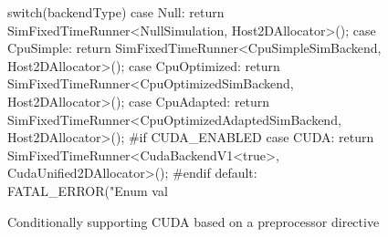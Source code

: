 \begin{figure}[ht]
    \centering
\begin{cppcode}
switch(backendType) {
    case Null:
        return SimFixedTimeRunner<NullSimulation, Host2DAllocator>();
    case CpuSimple:
        return SimFixedTimeRunner<CpuSimpleSimBackend, Host2DAllocator>();
    case CpuOptimized:
        return SimFixedTimeRunner<CpuOptimizedSimBackend, Host2DAllocator>();
    case CpuAdapted:
        return SimFixedTimeRunner<CpuOptimizedAdaptedSimBackend, Host2DAllocator>();
#if CUDA_ENABLED
    case CUDA:
        return SimFixedTimeRunner<CudaBackendV1<true>, CudaUnified2DAllocator>();
#endif
    default:
        FATAL_ERROR("Enum val %
}\end{cppcode}
\caption{Conditionally supporting CUDA based on a preprocessor directive}
    \label{fig:ConditionalCUDA}
\end{figure}